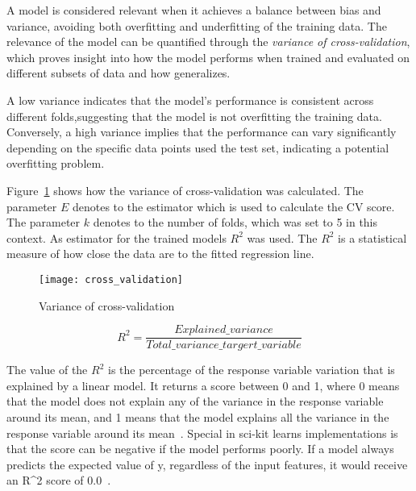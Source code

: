 A model is considered relevant when it achieves a balance between bias and
variance, avoiding both overfitting and underfitting of the training data.
The relevance of the model can be quantified through the \textit{variance of
cross-validation}, which proves insight into how the model performs when trained and
evaluated on different subsets of data and how generalizes.

A low variance indicates that the model's performance is consistent across
different folds,suggesting that the model is not overfitting the training data.
Conversely, a high variance implies that the performance can vary significantly
depending on the specific data points used the test set, indicating a potential
overfitting problem.

Figure~\ref{fig:variance-of-cv} shows how the variance of cross-validation
was calculated.
The parameter \(E\) denotes to the estimator which is used to calculate the
\ac{CV} score.
The parameter \(k\) denotes to the number of folds, which was set to 5 in this
context.
As estimator for the trained models \(R^2\) was used.
The \(R^2\) is a statistical measure of how close the data are to the fitted regression
line.

\begin{figure}[h]
    \begin{tcolorbox}[arc=0pt,boxrule=0.5pt]
        \centering
        \texttt{[image: cross\_validation]}
        \caption{Variance of cross-validation}
        \label{fig:variance-of-cv}
    \end{tcolorbox}
\end{figure}

\begin{equation}
    \label{eq:r2}
    R^2 = \frac{Explained\_variance}{Total\_variance\_targert\_variable}
\end{equation}

The value of the \(R^2\) is the percentage of the response variable variation that is
explained by a linear model.
It returns a score between 0 and 1, where 0 means that the model does not
explain any of the variance in the response variable around its mean, and 1 means that
the model explains all the variance in the response variable around its mean~\cite[p.
43]{muller_introductionmachinelearning_2016}.
Special in sci-kit learns implementations is that the score can be negative if the model
performs poorly.
If a model always predicts the expected value of y, regardless of the
input features, it would receive an R^2 score of 0.0~\cite{_sklearnmetricsr2_}.

